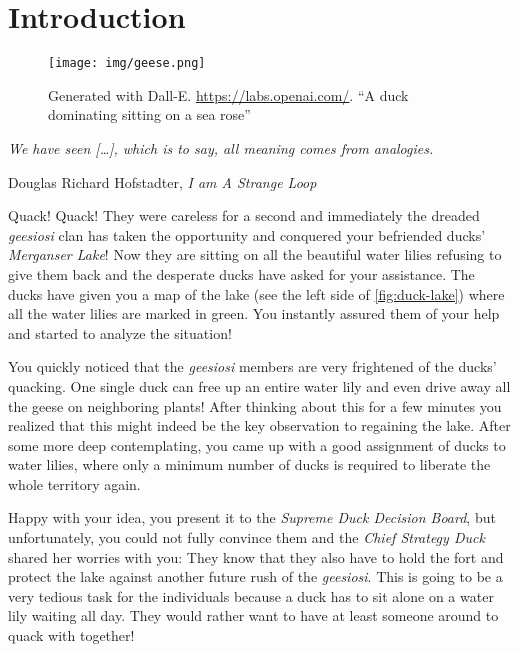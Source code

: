\chapter{Introduction}\label{ch:introduction}

\vspace*{-50pt}

\begin{figure}[ht]
        \texttt{[image: img/geese.png]}
        \captionsetup{textformat=empty,labelformat=blank}
        \caption{Generated with Dall-E. \url{https://labs.openai.com/}. ``A duck dominating sitting on a sea rose''}
\end{figure}

\epigraph{\itshape We have seen [\ldots], which is to say, all meaning comes from analogies.}{Douglas Richard Hofstadter, \textit{I am A Strange Loop}}

Quack! Quack! They were careless for a second and immediately the dreaded \textit{geesiosi} clan has taken the opportunity and conquered your befriended ducks' \textit{Merganser Lake}!
Now they are sitting on all the beautiful water lilies refusing to give them back and the desperate ducks have asked for your assistance.
The ducks have given you a map of the lake (see the left side of \cref{fig:duck-lake}) where all the water lilies are marked in green.
You instantly assured them of your help and started to analyze the situation!

You quickly noticed that the \textit{geesiosi} members are very frightened of the ducks' quacking. 
One single duck can free up an entire water lily and even drive away all the geese on neighboring plants! After thinking about this for a few minutes you realized that this might indeed be the key observation to regaining the lake. 
After some more deep contemplating, you came up with a good assignment of ducks to water lilies, where only a minimum number of ducks is required to liberate the whole territory again.

Happy with your idea, you present it to the \textit{Supreme Duck Decision Board}, but unfortunately, you could not fully convince them and the \textit{Chief Strategy Duck} shared her worries with you: 
They know that they also have to hold the fort and protect the lake against another future rush of the \textit{geesiosi}.
This is going to be a very tedious task for the individuals because a duck has to sit alone on a water lily waiting all day. They would rather want to have at least someone around to quack with together!

